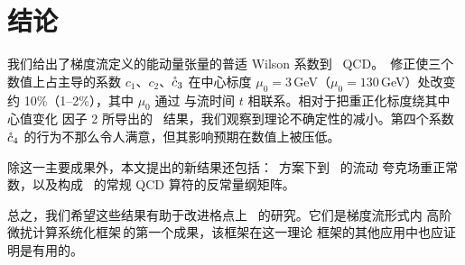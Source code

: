 \section{结论}\label{sec:conclusions}

我们给出了梯度流定义的能动量张量的普适 Wilson 系数到 \nnlo\ QCD。\nnlo\
修正使三个数值上占主导的系数 $c_1$、$c_2$、$\mathring{c}_3$ 在中心标度
$\mu_0=3$\,GeV（$\mu_0=130$\,GeV）处改变约 10\%（1--2\%），其中 $\mu_0$
通过  与流时间 $t$ 相联系。相对于把重正化标度绕其中心值变化
因子 2 所导出的 \nlo\ 结果，我们观察到理论不确定性的减小。第四个系数
$\mathring{c}_4$ 的行为不那么令人满意，但其影响预期在数值上被压低。

除这一主要成果外，本文提出的新结果还包括：\msbar\ 方案下到 \nnlo\ 的流动
夸克场重正常数，以及构成 \emt\ 的常规 QCD 算符的反常量纲矩阵。

总之，我们希望这些结果有助于改进格点上 \emt\ 的研究。它们是梯度流形式内
高阶微扰计算系统化框架\,\cite{Artz:2019bpr}的第一个成果，该框架在这一理论
框架的其他应用中也应证明是有用的。
